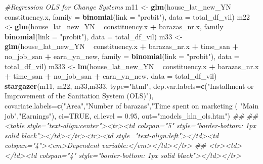 \documentclass[
]{article}
\newenvironment{Shaded}{\begin{snugshade}}{\end{snugshade}}
\newcommand{\CommentTok}[1]{\textcolor[rgb]{0.56,0.35,0.01}{\textit{#1}}}
\newcommand{\DataTypeTok}[1]{\textcolor[rgb]{0.13,0.29,0.53}{#1}}
\newcommand{\FloatTok}[1]{\textcolor[rgb]{0.00,0.00,0.81}{#1}}
\newcommand{\KeywordTok}[1]{\textcolor[rgb]{0.13,0.29,0.53}{\textbf{#1}}}
\newcommand{\NormalTok}[1]{#1}
\newcommand{\OperatorTok}[1]{\textcolor[rgb]{0.81,0.36,0.00}{\textbf{#1}}}
\newcommand{\OtherTok}[1]{\textcolor[rgb]{0.56,0.35,0.01}{#1}}
\newcommand{\StringTok}[1]{\textcolor[rgb]{0.31,0.60,0.02}{#1}}
\begin{document}
\begin{Shaded}
\begin{Highlighting}[]
{{{{{{{{{{\CommentTok{#Regression OLS for Change Systems}
\NormalTok{m11 <-}\StringTok{ }\KeywordTok{glm}\NormalTok{(house_lat_new_YN }\OperatorTok{~}\StringTok{ }\NormalTok{constituency.x, }\DataTypeTok{family =} \KeywordTok{binomial}\NormalTok{(}\DataTypeTok{link =} \StringTok{"probit"}\NormalTok{), }
           \DataTypeTok{data =}\NormalTok{ total_df_vil)}
\NormalTok{m22 <-}\StringTok{ }\KeywordTok{glm}\NormalTok{(house_lat_new_YN }\OperatorTok{~}\StringTok{ }\NormalTok{constituency.x }\OperatorTok{+}\StringTok{ }\NormalTok{barazas_nr.x, }\DataTypeTok{family =} \KeywordTok{binomial}\NormalTok{(}\DataTypeTok{link =} \StringTok{"probit"}\NormalTok{), }
           \DataTypeTok{data =}\NormalTok{ total_df_vil)}
\NormalTok{m33 <-}\StringTok{ }\KeywordTok{glm}\NormalTok{(house_lat_new_YN }\OperatorTok{~}\StringTok{ }\NormalTok{constituency.x }\OperatorTok{+}\StringTok{ }\NormalTok{barazas_nr.x }\OperatorTok{+}\StringTok{ }\NormalTok{time_san }\OperatorTok{+}\StringTok{ }\NormalTok{no_job_san }\OperatorTok{+}\StringTok{ }\NormalTok{earn_yn_new, }\DataTypeTok{family =} \KeywordTok{binomial}\NormalTok{(}\DataTypeTok{link =} \StringTok{"probit"}\NormalTok{), }
           \DataTypeTok{data =}\NormalTok{ total_df_vil)}
\NormalTok{m333 <-}\StringTok{ }\KeywordTok{lm}\NormalTok{(house_lat_new_YN }\OperatorTok{~}\StringTok{ }\NormalTok{constituency.x }\OperatorTok{+}\StringTok{ }\NormalTok{barazas_nr.x }\OperatorTok{+}\StringTok{ }\NormalTok{time_san }\OperatorTok{+}\StringTok{ }\NormalTok{no_job_san }\OperatorTok{+}\StringTok{ }\NormalTok{earn_yn_new,  }
           \DataTypeTok{data =}\NormalTok{ total_df_vil)}
\KeywordTok{stargazer}\NormalTok{(m11, m22, m33,m333, }\DataTypeTok{type=}\StringTok{"html"}\NormalTok{,}
          \DataTypeTok{dep.var.labels=}\KeywordTok{c}\NormalTok{(}\StringTok{"Installment or Improvement of the Sanitation System (OLS)"}\NormalTok{),}
          \DataTypeTok{covariate.labels=}\KeywordTok{c}\NormalTok{(}\StringTok{"Area"}\NormalTok{,}\StringTok{"Number of barazas"}\NormalTok{,}\StringTok{"Time spent on marketing (%) "}\NormalTok{,}
                             \StringTok{"Main job"}\NormalTok{,}\StringTok{"Earnings"}\NormalTok{), }\DataTypeTok{ci=}\OtherTok{TRUE}\NormalTok{, }\DataTypeTok{ci.level =} \FloatTok{0.95}\NormalTok{, }\DataTypeTok{out=}\StringTok{"models_hln_ols.htm"}\NormalTok{)}
\CommentTok{## }
\CommentTok{## <table style="text-align:center"><tr><td colspan="5" style="border-bottom: 1px solid black"></td></tr><tr><td style="text-align:left"></td><td colspan="4"><em>Dependent variable:</em></td></tr>}
\CommentTok{## <tr><td></td><td colspan="4" style="border-bottom: 1px solid black"></td></tr>}
}}}}}}}}}}}
\end{Highlighting}
\end{Shaded}
\end{document}
